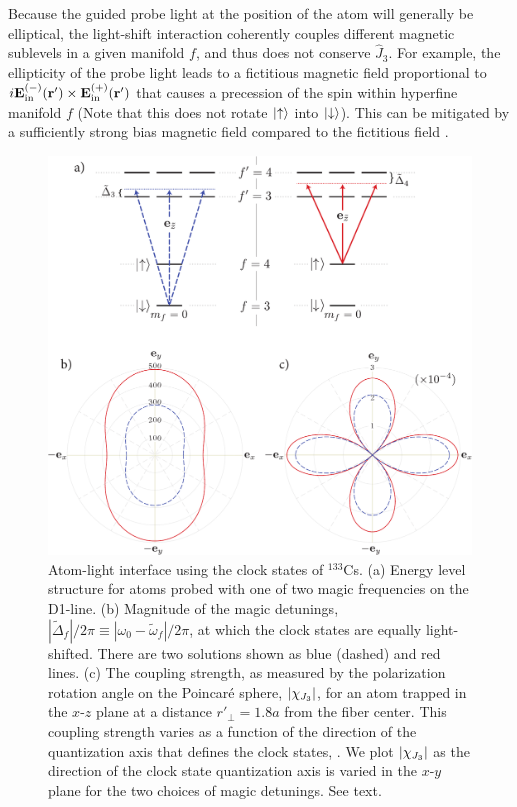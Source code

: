 \documentclass[aps,pra,twocolumn]{revtex4-1} %
\newcommand{\inp}{{\rm in}}
\newcommand{\magic}[1]{\tilde{\omega}_{#1}}
\newcommand{\comment}[1]{{\color{Maroon} #1}}
\begin{document}
Because the guided probe light at the position of the atom will generally be elliptical, the light-shift interaction coherently couples different magnetic sublevels in a given manifold $f$, and thus does not conserve $\hat{J}_3$.  For example, the ellipticity of the probe light leads to a fictitious magnetic field proportional to $i \mathbf{E}^{(-)}_{\inp}(\br') \times \mathbf{E}^{(+)}_{\inp}(\br')$ that causes a precession of the {\color{blue} spin within hyperfine manifold $f$} \comment{(Note that this does not rotate $\lvert{\uparrow}\rangle$ into $\lvert{\downarrow}\rangle$)}.  This can be mitigated by a sufficiently strong bias magnetic field compared to the fictitious field \cite{smith_continuous_2004}. 


\begin{figure}
\includegraphics[scale=0.44]{./Figs/Fig_MagicFrequencies}
\caption{Atom-light interface using the clock states of $^{133}$Cs.  
(a) Energy level structure for atoms probed with one of two magic frequencies on the D1-line. 
(b) Magnitude of the magic detunings, $| \tilde{\Delta}_{f}|/2\pi \equiv | \omega_0 - \magic{f} |/2\pi$, {\color{blue} at which the clock states are equally light-shifted.  There are two solutions shown as blue (dashed) and red lines. (c) The coupling strength, as measured by the polarization rotation angle on the Poincar\'{e} sphere, $|\chi_{\tiny J_3}|$, for an atom trapped in the $x$-$z$ plane at a distance $ r'\!_\perp=1.8a $ from the fiber center.  This coupling strength varies as a function of the direction of the quantization axis that defines the clock states, .  We plot $|\chi_{\tiny J_3}|$ as the direction of the clock state quantization axis is varied in the $x$-$y$ plane for the two choices of magic detunings.}
See text.}\label{Fig::CouplingStrength}
\end{figure}
\end{document}
